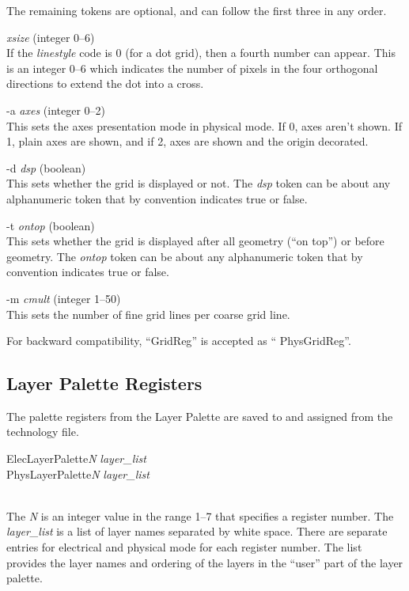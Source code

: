 \begin{description}
The remaining tokens are optional, and can follow the first three in
any order.

\begin{description}
\item{\it xsize} (integer 0--6)\\
If the {\it linestyle} code is 0 (for a dot grid), then a fourth
number can appear.  This is an integer 0--6 which indicates the number
of pixels in the four orthogonal directions to extend the dot into a
cross.

\item{\vt -a} {\it axes} (integer 0--2)\\
This sets the axes presentation mode in physical mode.  If 0, axes
aren't shown.  If 1, plain axes are shown, and if 2, axes are shown
and the origin decorated.

\item{\vt -d} {\it dsp} (boolean)\\
This sets whether the grid is displayed or not.  The {\it dsp} token
can be about any alphanumeric token that by convention indicates true
or false.

\item{\vt -t} {\it ontop} (boolean)\\
This sets whether the grid is displayed after all geometry (``on
top'') or before geometry.  The {\it ontop} token can be about any
alphanumeric token that by convention indicates true or false.

\item{\vt -m} {\it cmult} (integer 1--50)\\
This sets the number of fine grid lines per coarse grid line.
\end{description}
For backward compatibility, ``{\vt GridReg}'' is accepted as ``{\vt
PhysGridReg}''.
\end{description}


\subsection{Layer Palette Registers}

The palette registers from the {\cb Layer Palette} are saved
to and assigned from the technology file.

\begin{description}
\item\parbox[b]{4in}{{\vt ElecLayerPalette}{\it N} {\it layer\_list}\\
 {\vt PhysLayerPalette}{\it N} {\it layer\_list}}\\
The {\it N} is an integer value in the range 1--7 that specifies a
register number.  The {\it layer\_list} is a list of layer names
separated by white space.  There are separate entries for electrical
and physical mode for each register number.  The list provides the
layer names and ordering of the layers in the ``user'' part of the
layer palette.
\end{description}


